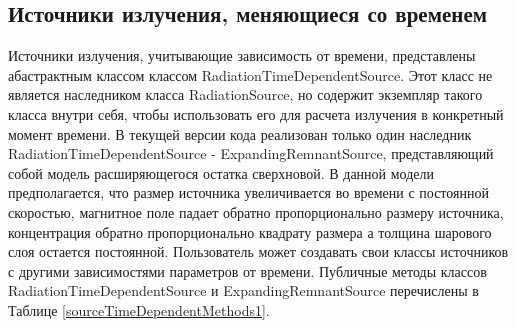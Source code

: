 \subsection{Источники излучения, меняющиеся со временем}
Источники излучения, учитывающие зависимость от времени, представлены абастрактным классом классом RadiationTimeDependentSource. Этот класс не является наследником класса RadiationSource, но содержит экземпляр такого класса внутри себя, чтобы использовать его для расчета излучения в конкретный момент времени. В текущей версии кода реализован только один наследник RadiationTimeDependentSource - ExpandingRemnantSource, представляющий собой модель расширяющегося остатка сверхновой. В данной модели предполагается, что размер источника увеличивается во времени с постоянной скоростью, магнитное поле падает обратно пропорционально размеру источника, концентрация обратно пропорционально квадрату размера а толщина шарового слоя остается постоянной. Пользователь может создавать свои классы источников с другими зависимостями параметров от времени. Публичные методы классов RadiationTimeDependentSource и ExpandingRemnantSource перечислены  в Таблице \ref{sourceTimeDependentMethods1}.

